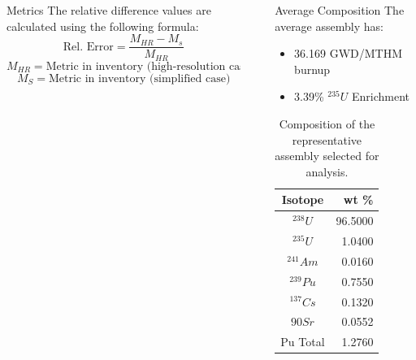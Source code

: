 \documentclass[final]{beamer}
\newlength{\sepwid}
\newlength{\onecolwid}
\newlength{\threecolwid}
\begin{document}
\begin{frame}[t]
\begin{columns}[t,totalwidth=\threecolwid]
\begin{column}{\onecolwid}
\begin{block}{Metrics}
The relative difference values are calculated using the following formula:
\[\text{Rel. Error} = \frac{M_{HR} - M_{s}}{M_{HR}}\]
\[M_{HR} = \text{Metric in inventory (high-resolution case)}\]
\[M_{S} = \text{Metric in inventory (simplified case)}\]

\end{block}


\end{column} %

\begin{column}{\sepwid}\end{column} %



\begin{column}{\onecolwid} %






\begin{block}{Average Composition}
The average assembly has:
\begin{itemize}
    \item 36.169 GWD/MTHM burnup
    \item 3.39\% $^{235}U$ Enrichment
\end{itemize}

\begin{table}[h]
    \centering
    \begin{tabular}{cr}
        \hline
        Isotope & wt \% \\
        \hline
        $^{238}U$ & 96.5000 \\
        $^{235}U$ & 1.0400 \\
        $^{241}Am$ & 0.0160 \\
        $^{239}Pu$ & 0.7550   \\
        $^{137}Cs$ & 0.1320   \\
        ${90}Sr$ & 0.0552  \\
        Pu Total & 1.2760   \\
        \hline
    \end{tabular}
    \caption{Composition of the representative
             assembly selected for analysis.}
    \label{tab:avg}
\end{table}


\end{block}
\end{column}
\end{columns}
\end{frame}
\end{document}
